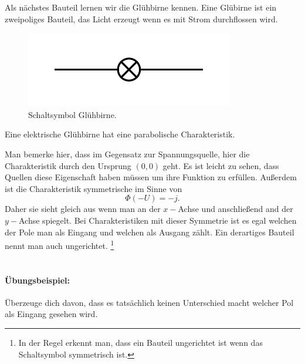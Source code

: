 \documentclass[11pt,a4paper,leqno]{report}
\numberwithin{equation}{chapter}
\begin{document}
Als n\"achstes Bauteil lernen wir die Gl\"uhbirne kennen. Eine Gl\"ubirne ist ein zweipoliges Bauteil, das Licht erzeugt wenn es mit Strom durchflossen wird.
\begin{figure}[H]
	\begin{center}
		\includegraphics[scale=1]{gluh.pdf}
		\caption{Schaltsymbol Gl\"uhbirne.}
	\end{center}
\end{figure}
\noindent
Eine elektrische Gl\"uhbirne hat eine parabolische Charakteristik.
\begin{figure}[H]
\end{figure}
\noindent
Man bemerke hier, dass im Gegensatz zur Spannungsquelle, hier die Charakteristik durch den Ursprung $(0,0)$ geht. Es ist leicht zu sehen, dass Quellen diese Eigenschaft haben m\"ussen um ihre Funktion zu erf\"ullen. Au\ss{}erdem ist die Charakteristik symmetrische im Sinne von 
\begin{equation*}
	\Phi(-U) = - j.
\end{equation*}
Daher sie sieht gleich aus wenn man an der $x-$Achse und anschlie\ss{}end and der $y-$Achse spiegelt. Bei Charakteristiken mit dieser Symmetrie ist es egal welchen der Pole man als Eingang und welchen als Ausgang z\"ahlt. Ein derartiges Bauteil nennt man auch ungerichtet. \footnote{In der Regel erkennt man, dass ein Bauteil ungerichtet ist wenn das Schaltsymbol symmetrisch ist.}
\\
\\
\paragraph{\"Ubungsbeispiel:} \"Uberzeuge dich davon, dass es tats\"achlich keinen Unterschied macht welcher Pol als Eingang gesehen wird. 
\end{document}
